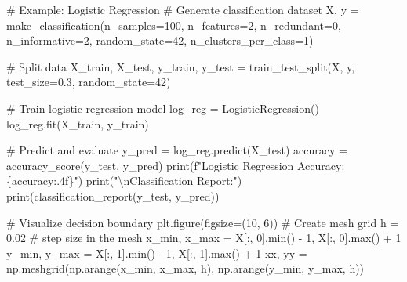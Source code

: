 \documentclass[
  letterpaper,
  DIV=11,
  numbers=noendperiod]{scrreprt}
\newenvironment{Shaded}{\begin{snugshade}}{\end{snugshade}}
\newcommand{\BuiltInTok}[1]{\textcolor[rgb]{0.00,0.23,0.31}{#1}}
\newcommand{\CharTok}[1]{\textcolor[rgb]{0.13,0.47,0.30}{#1}}
\newcommand{\CommentTok}[1]{\textcolor[rgb]{0.37,0.37,0.37}{#1}}
\newcommand{\DecValTok}[1]{\textcolor[rgb]{0.68,0.00,0.00}{#1}}
\newcommand{\FloatTok}[1]{\textcolor[rgb]{0.68,0.00,0.00}{#1}}
\newcommand{\NormalTok}[1]{\textcolor[rgb]{0.00,0.23,0.31}{#1}}
\newcommand{\OperatorTok}[1]{\textcolor[rgb]{0.37,0.37,0.37}{#1}}
\newcommand{\SpecialCharTok}[1]{\textcolor[rgb]{0.37,0.37,0.37}{#1}}
\newcommand{\SpecialStringTok}[1]{\textcolor[rgb]{0.13,0.47,0.30}{#1}}
\newcommand{\StringTok}[1]{\textcolor[rgb]{0.13,0.47,0.30}{#1}}
\begin{document}
\begin{Shaded}
\begin{Highlighting}[]
\CommentTok{\# Example: Logistic Regression}
\CommentTok{\# Generate classification dataset}
\NormalTok{X, y }\OperatorTok{=}\NormalTok{ make\_classification(n\_samples}\OperatorTok{=}\DecValTok{100}\NormalTok{, n\_features}\OperatorTok{=}\DecValTok{2}\NormalTok{, n\_redundant}\OperatorTok{=}\DecValTok{0}\NormalTok{, }
\NormalTok{                           n\_informative}\OperatorTok{=}\DecValTok{2}\NormalTok{, random\_state}\OperatorTok{=}\DecValTok{42}\NormalTok{, n\_clusters\_per\_class}\OperatorTok{=}\DecValTok{1}\NormalTok{)}

\CommentTok{\# Split data}
\NormalTok{X\_train, X\_test, y\_train, y\_test }\OperatorTok{=}\NormalTok{ train\_test\_split(X, y, test\_size}\OperatorTok{=}\FloatTok{0.3}\NormalTok{, random\_state}\OperatorTok{=}\DecValTok{42}\NormalTok{)}

\CommentTok{\# Train logistic regression model}
\NormalTok{log\_reg }\OperatorTok{=}\NormalTok{ LogisticRegression()}
\NormalTok{log\_reg.fit(X\_train, y\_train)}

\CommentTok{\# Predict and evaluate}
\NormalTok{y\_pred }\OperatorTok{=}\NormalTok{ log\_reg.predict(X\_test)}
\NormalTok{accuracy }\OperatorTok{=}\NormalTok{ accuracy\_score(y\_test, y\_pred)}
\BuiltInTok{print}\NormalTok{(}\SpecialStringTok{f"Logistic Regression Accuracy: }\SpecialCharTok{\{}\NormalTok{accuracy}\SpecialCharTok{:.4f\}}\SpecialStringTok{"}\NormalTok{)}
\BuiltInTok{print}\NormalTok{(}\StringTok{"}\CharTok{\textbackslash{}n}\StringTok{Classification Report:"}\NormalTok{)}
\BuiltInTok{print}\NormalTok{(classification\_report(y\_test, y\_pred))}

\CommentTok{\# Visualize decision boundary}
\NormalTok{plt.figure(figsize}\OperatorTok{=}\NormalTok{(}\DecValTok{10}\NormalTok{, }\DecValTok{6}\NormalTok{))}
\CommentTok{\# Create mesh grid}
\NormalTok{h }\OperatorTok{=} \FloatTok{0.02}  \CommentTok{\# step size in the mesh}
\NormalTok{x\_min, x\_max }\OperatorTok{=}\NormalTok{ X[:, }\DecValTok{0}\NormalTok{].}\BuiltInTok{min}\NormalTok{() }\OperatorTok{{-}} \DecValTok{1}\NormalTok{, X[:, }\DecValTok{0}\NormalTok{].}\BuiltInTok{max}\NormalTok{() }\OperatorTok{+} \DecValTok{1}
\NormalTok{y\_min, y\_max }\OperatorTok{=}\NormalTok{ X[:, }\DecValTok{1}\NormalTok{].}\BuiltInTok{min}\NormalTok{() }\OperatorTok{{-}} \DecValTok{1}\NormalTok{, X[:, }\DecValTok{1}\NormalTok{].}\BuiltInTok{max}\NormalTok{() }\OperatorTok{+} \DecValTok{1}
\NormalTok{xx, yy }\OperatorTok{=}\NormalTok{ np.meshgrid(np.arange(x\_min, x\_max, h), np.arange(y\_min, y\_max, h))}


\end{Highlighting}
\end{Shaded}
\end{document}

